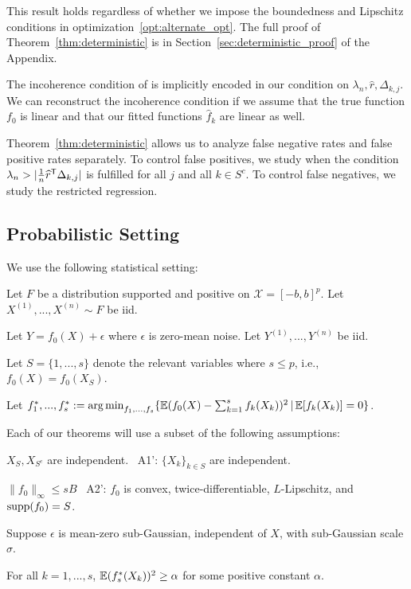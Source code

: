 This result holds regardless of whether we impose the boundedness and Lipschitz conditions in optimization~\ref{opt:alternate_opt}.
The full proof of Theorem~\ref{thm:deterministic} is in Section~\ref{sec:deterministic_proof} of the Appendix.

\begin{remark}
  The incoherence condition of \cite{Wain:09a} is implicitly encoded
  in our condition on $\lambda_n, \hat{r}, \Delta_{k,j}$. We can
  reconstruct the incoherence condition if we assume that the true
  function $f_0$ is linear and that our fitted functions $\hat{f}_k$
  are linear as well.
\end{remark}

Theorem~\ref{thm:deterministic} allows us to analyze false negative
rates and false positive rates separately. To control false positives,
we study when the condition $\lambda_n > | \frac{1}{n} \widehat{r}^{\mathsf{T}}
\Delta_{k,j}|$ is fulfilled for all $j$ and all $k \in S^c$. To
control false negatives, we study the restricted regression.

\subsection{Probabilistic Setting}

We use the following statistical setting:

\begin{packed_enum}
\item Let $F$ be a distribution supported and positive on $\mathcal{X}=[-b,b]^p$. Let $X^{(1)},..., X^{(n)} \sim F$ be iid.
\item Let $Y = f_0(X) + \epsilon$ where $\epsilon$ is zero-mean noise. Let $Y^{(1)},...,Y^{(n)}$ be iid.
\item Let $S = \{1,...,s\}$ denote the relevant variables where $s\leq p$, i.e.,
  $f_0(X) = f_0(X_S)$.
\item Let $f^*_1,...,f^*_s := \mathop{\text{\rm arg\,min}}_{f_1,...,f_s} \{ {\mathbb E}(f_0(X) - \sum_{k=1}^s f_k(X_k))^2 \,|\, {\mathbb E}[f_k(X_k)] = 0 \}$.
\end{packed_enum}

Each of our theorems will use a subset of the following assumptions:
\begin{packed_enum}
\item[A1:] $X_S, X_{S^c}$ are independent.  \ A1': $\{ X_k \}_{k \in S}$ are independent.
\item[A2:] $\|f_0\|_\infty \leq sB$ \  A2': $f_0$ is convex,
  twice-differentiable, $L$-Lipschitz, and $\textrm{supp}(f_0) = S$.
\item[A3:] Suppose $\epsilon$ is mean-zero sub-Gaussian, independent of $X$, with sub-Gaussian scale $\sigma$.
\item[A4:] For all $k=1,...,s$, ${\mathbb E}(f^*_s(X_k))^2 \geq \alpha$ for some positive constant $\alpha$.
\end{packed_enum}

